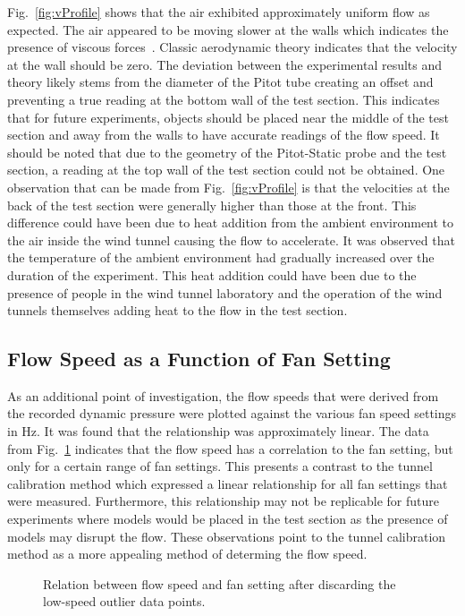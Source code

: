 \documentclass[journal,letterpaper]{IEEEtran}
\begin{document}
Fig.~\ref{fig:vProfile} shows that the air exhibited approximately uniform flow as expected.
The air appeared to be moving slower at the walls which indicates the presence of viscous forces~\cite{lecture}.
Classic aerodynamic theory indicates that the velocity at the wall should be zero.
The deviation between the experimental results and theory likely stems from the diameter of the Pitot tube creating an offset and preventing a true reading at the bottom wall of the test section.
This indicates that for future experiments, objects should be placed near the middle of the test section and away from the walls to have accurate readings of the flow speed.
It should be noted that due to the geometry of the Pitot-Static probe and the test section, a reading at the top wall of the test section could not be obtained.
One observation that can be made from Fig.~\ref{fig:vProfile} is that the velocities at the back of the test section were generally higher than those at the front.
This difference could have been due to heat addition from the ambient environment to the air inside the wind tunnel causing the flow to accelerate.
It was observed that the temperature of the ambient environment had gradually increased over the duration of the experiment.
This heat addition could have been due to the presence of people in the wind tunnel laboratory and the operation of the wind tunnels themselves adding heat to the flow in the test section.

\subsection{Flow Speed as a Function of Fan Setting}

As an additional point of investigation, the flow speeds that were derived from the recorded dynamic pressure were plotted against the various fan speed settings in \unit{\hertz}.
It was found that the relationship was approximately linear.
The data from Fig.~\ref{fig:Hz} indicates that the flow speed has a correlation to the fan setting, but only for a certain range of fan settings.
This presents a contrast to the tunnel calibration method which expressed a linear relationship for all fan settings that were measured.
Furthermore, this relationship may not be replicable for future experiments where models would be placed in the test section as the presence of models may disrupt the flow.
These observations point to the tunnel calibration method as a more appealing method of determing the flow speed.

\begin{figure}[H]
    \centering
    
    \caption{Relation between flow speed and fan setting after discarding the low-speed outlier data points.}
    \label{fig:Hz}
\end{figure}
\end{document}
